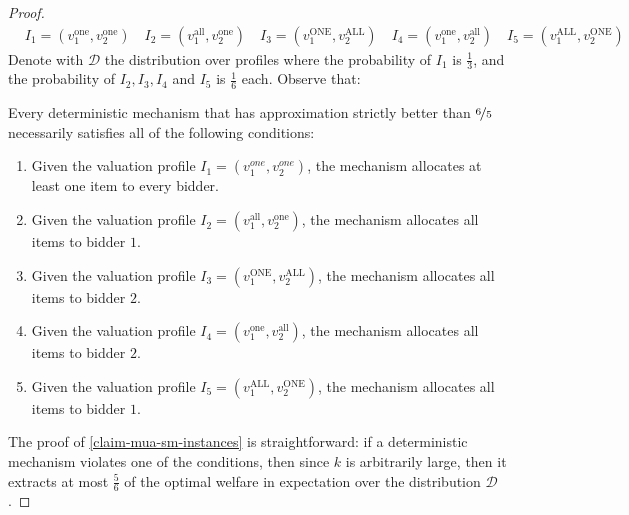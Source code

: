 \begin{proof}
\[\begin{aligned}
& I_1 = (v_1^{\text{one}}, v_2^{\text{one}}) \quad 
I_2 = (v_1^{\text{all}}, v_2^{\text{one}}) \quad 
I_3 = (v_1^{\text{ONE}}, v_2^{\text{ALL}}) \quad 
I_4 = (v_1^{\text{one}}, v_2^{\text{all}}) \quad
I_5 = (v_1^{\text{ALL}}, v_2^{\text{ONE}})
\end{aligned}
\]
Denote with $\mathcal D$ the distribution over 
profiles where the probability of  $I_1$ is $\frac{1}{3}$, and the probability of $I_2,I_3,I_4$ and $I_5$ is $\frac{1}{6}$ each. 
Observe that:
\begin{claim}\label{claim-mua-sm-instances}
Every deterministic mechanism that has approximation strictly better than $\nicefrac{6}{5}$ necessarily satisfies all of the following conditions:
\begin{enumerate}
    \item Given the valuation profile $I_1=(v_1^{one},v_2^{one})$, the mechanism
    allocates at least one item to every bidder. \label{condi-1}
    \item Given the valuation profile $I_2 = (v_1^{\text{all}}, v_2^{\text{one}})$, the mechanism allocates all items to bidder $1$.
    \label{condi-3}
\item Given the valuation profile $I_3 = (v_1^{\text{ONE}}, v_2^{\text{ALL}})$, the mechanism allocates all items to bidder $2$. \label{condi-2}
\item Given the valuation profile $I_4 = (v_1^{\text{one}}, v_2^{\text{all}})$, the mechanism allocates all items to bidder $2$. 
\item Given the valuation profile $I_5 =(v_1^{\text{ALL}}, v_2^{\text{ONE}})$, the mechanism allocates all items to bidder $1$. \label{condi-5}
\end{enumerate}
\end{claim}
The proof of \cref{claim-mua-sm-instances} is straightforward: if a deterministic mechanism violates one of the conditions, then since $k$ is arbitrarily large, then it  extracts at most $\frac{5}{6}$ of the optimal welfare in expectation over the distribution $\mathcal D$. 



\end{proof}
